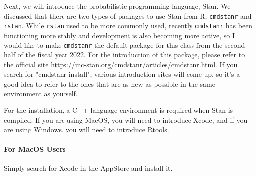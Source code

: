 \documentclass{ltjsbook}
\begin{document}
Next, we will introduce the probabilistic programming language, Stan. We discussed that there are two types of packages to use Stan from R, \texttt{cmdstanr} and \texttt{rstan}. While \texttt{rstan} used to be more commonly used, recently \texttt{cmdstanr} has been functioning more stably and development is also becoming more active, so I would like to make \texttt{cmdstanr} the default package for this class from the second half of the fiscal year 2022. For the introduction of this package, please refer to the official site \url{https://mc-stan.org/cmdstanr/articles/cmdstanr.html}. If you search for "cmdstanr install", various introduction sites will come up, so it's a good idea to refer to the ones that are as new as possible in the same environment as yourself.

For the installation, a C++ language environment is required when Stan is compiled. If you are using MacOS, you will need to introduce Xcode, and if you are using Windows, you will need to introduce Rtools.
\paragraph*{For MacOS Users} Simply search for Xcode in the AppStore and install it.

\end{document}
